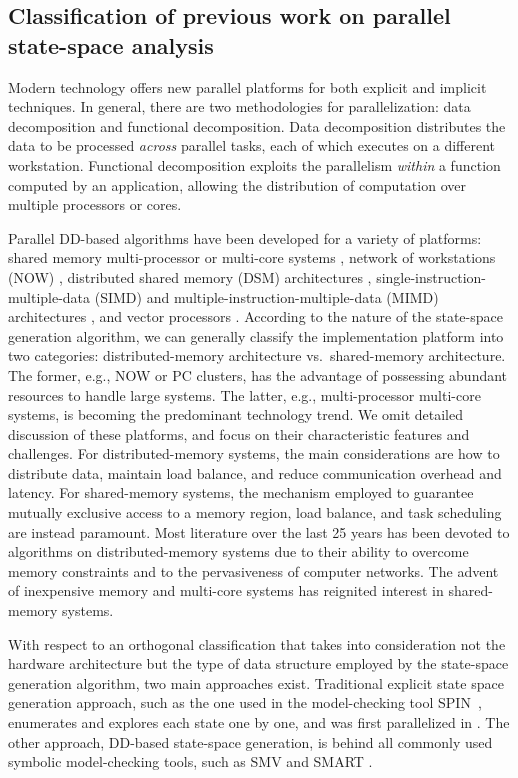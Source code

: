 \documentclass[copyright,creativecommons]{eptcs}
\begin{document}
\subsection{Classification of previous work on parallel state-space analysis}

Modern technology offers new parallel platforms for both explicit and
implicit techniques.
In general, there are two methodologies for parallelization:
data decomposition and functional decomposition.
Data decomposition distributes the data to be processed \emph{across} parallel
tasks, each of which executes on a different workstation. 
Functional decomposition exploits the parallelism \emph{within}
a function computed by an application, allowing the distribution
of computation over multiple processors or cores.

Parallel DD-based algorithms have been developed for a variety of platforms:
shared memory multi-processor or multi-core systems \cite{Stornetta1995},
network of workstations (NOW) \cite{Milvang1998},
distributed shared memory (DSM) architectures \cite{Parasuram1994},
single-instruction-multiple-data (SIMD) and
multiple-instruction-multiple-data (MIMD) architectures \cite{Gai1995},
and vector processors \cite{Ochi1991Vector}.
According to the nature of the state-space generation algorithm,
we can generally classify the implementation platform into  two categories:
distributed-memory architecture vs.\ shared-memory architecture.
The former, e.g., NOW or PC clusters, has the advantage of possessing abundant
resources to handle large systems. 
The latter, e.g., multi-processor multi-core systems, is becoming
the predominant technology trend.
We omit detailed discussion of these platforms, and focus on their
characteristic features and challenges.
For distributed-memory systems, the main considerations are how to distribute
data, maintain load balance, and reduce communication overhead and latency.
For shared-memory systems, the mechanism employed to guarantee mutually
exclusive access to a memory region, load balance, and task scheduling
are instead paramount.
Most literature over the last 25 years has been devoted to algorithms on
distributed-memory systems due to their ability to overcome memory constraints
and to the pervasiveness of computer networks.
The advent of inexpensive memory and multi-core systems has reignited interest
in shared-memory systems.

With respect to an orthogonal classification that takes into consideration not
the hardware architecture but the type of data structure employed
by the state-space generation algorithm, two main approaches exist.
Traditional explicit state space generation approach, such as the one
used in the model-checking tool SPIN~\cite{Holzmann2003spin},
enumerates and explores each state one by one, and was first
parallelized in \cite{1998INFORMSJC-DistrGen,1997JPDC-AutomaticDistrGen,Stern97murphi}.
The other approach, DD-based state-space generation, is behind all
commonly used symbolic model-checking tools, such as
SMV \cite{McMillan1992SMV} and SMART \cite{2009PER-SMART}.
\end{document}
